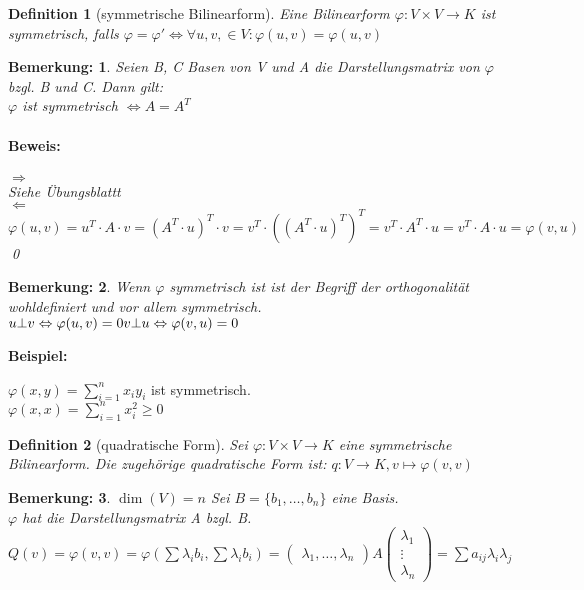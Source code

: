 \documentclass{report}
\newcommand{\lb}{\lambda}
\newcommand{\ve}[1]{{\begin{pmatrix}#1 \end{pmatrix}}}
\newenvironment{beispiel} {
\textbf{Beispiel:}\hfill\break
}{}
\theoremstyle{customrem}
\newtheorem*{bemerkung}{Bemerkung\textnormal:}
\theoremstyle{customdef}
\newtheorem{definition}{Definition}[chapter]
\renewenvironment{proof}{\paragraph{Beweis: }}{\qed}
\theoremstyle{customenv}
\begin{document}
\begin{definition}[symmetrische Bilinearform]
  Eine Bilinearform \(\varphi : V \times V \to K\) ist symmetrisch, falls
  \(\varphi = \varphi'
  \Leftrightarrow \forall u, v, \in V : \varphi(u, v) = \varphi(u, v)\)
\end{definition}

\begin{bemerkung}
  Seien B, C Basen von V und A die Darstellungsmatrix von \(\varphi\) bzgl.
  B und C. Dann gilt:\\
  \(\varphi\) ist symmetrisch \(\Leftrightarrow A = A^T\)
  \begin{proof}\hfill\break
    \(\Rightarrow\)\\
    Siehe \"Ubungsblattt\\
    \(\Leftarrow\)\\
    \(
    \varphi(u, v)
    = u^T \cdot A \cdot v
    = (A^T \cdot u)^T \cdot v
    = v^T \cdot ((A^T \cdot u)^T)^T
    = v^T \cdot A^T \cdot u
    = v^T \cdot A \cdot u
    = \varphi(v, u)
    \)
  \end{proof}
\end{bemerkung}

\begin{bemerkung}
  Wenn \(\varphi\) symmetrisch ist ist der Begriff der orthogonalit\"at
  wohldefiniert und vor allem symmetrisch.\\
  \(
  u \bot v \Leftrightarrow \varphi(u, v) = 0\\
  v \bot u \Leftrightarrow \varphi(v, u) = 0
  \)
\end{bemerkung}

\begin{beispiel}
  \(\varphi(x, y) = \sum_{i=1}^n x_i y_i\) ist symmetrisch.\\
  \(\varphi(x, x) = \sum_{i=1}^n x_i^2 \ge 0\)
\end{beispiel}

\begin{definition}[quadratische Form]
  Sei \(\varphi : V \times V \to K\) eine symmetrische Bilinearform.
  Die zugeh\"orige quadratische Form ist:
  \(q : V \to K, v \mapsto \varphi(v, v)\)
\end{definition}

\begin{bemerkung}
  \(\dim(V) = n\) Sei \(B = \{b_1, \dots, b_n\}\) eine Basis.\\
  \(\varphi\) hat die Darstellungsmatrix A bzgl. B.\\
  \(Q(v) = \varphi(v, v) = \varphi(\sum \lb_i b_i, \sum \lb_i b_i)
  = \ve{\lb_1, \dots, \lb_n} A \ve{\lb_1 \\ \vdots \\ \lb_n}
  = \sum a_{ij} \lb_i \lb_j
  \)
\end{bemerkung}
\end{document}
